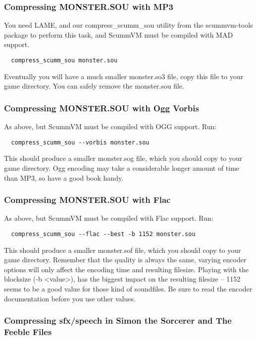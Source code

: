 \subsubsection{Compressing MONSTER.SOU with MP3}

You need LAME, and our compress\_scumm\_sou utility from the scummvm-tools
package to perform this task, and ScummVM must be compiled with MAD support.
\begin{verbatim}
  compress_scumm_sou monster.sou
\end{verbatim}
%
Eventually you will have a much smaller monster.so3 file, copy this file
to your game directory. You can safely remove the monster.sou file.


\subsubsection{Compressing MONSTER.SOU with Ogg Vorbis}

As above, but ScummVM must be compiled with OGG support. Run:
\begin{verbatim}
  compress_scumm_sou --vorbis monster.sou
\end{verbatim}
%
This should produce a smaller monster.sog file, which you should copy to your
game directory. Ogg encoding may take a considerable longer amount of time
than MP3, so have a good book handy.


\subsubsection{Compressing MONSTER.SOU with Flac}

As above, but ScummVM must be compiled with Flac support. Run:
\begin{verbatim}
  compress_scumm_sou --flac --best -b 1152 monster.sou
\end{verbatim}
%
This should produce a smaller monster.sof file, which you should copy to your
game directory. Remember that the quality is always the same, varying encoder
options will only affect the encoding time and resulting  filesize. Playing
with the blocksize (-b <value>), has the biggest impact on the resulting
filesize -- 1152 seems to be a good value for those kind of soundfiles. Be sure
to read the encoder documentation before you use other values.


\subsubsection{Compressing sfx/speech in Simon the Sorcerer and The Feeble Files}

